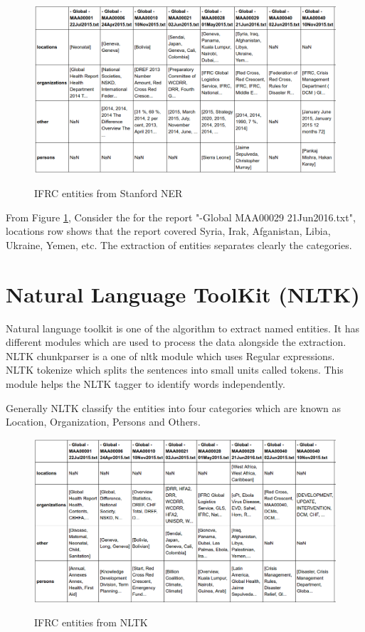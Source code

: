 \begin{figure}[hbtp]
\caption{IFRC entities from Stanford NER}
\centering\includegraphics[scale =.45]{images/stanford.png} \label{stanford}
\end{figure}
From Figure \ref{stanford},  Consider the for the report "-Global MAA00029 21Jun2016.txt", locations row  shows that the report covered Syria, Irak, Afganistan, Libia, Ukraine, Yemen, etc.
The extraction of entities separates clearly the categories.
\section{Natural Language ToolKit (NLTK)}
Natural language toolkit is one of the algorithm to extract named  entities. It has different modules which are used to process the data alongside the extraction.
NLTK chunkparser is a one of nltk module  which uses Regular expressions. NLTK tokenize which splits the sentences into small units called tokens. This module helps the NLTK tagger to identify words independently. 

Generally NLTK classify the entities into four categories which are known as Location, Organization, Persons and Others. 
\newpage

\begin{figure}[hbtp]
\caption{IFRC entities from NLTK}
\centering
\includegraphics[scale=.45]{images/nltkalgo.png}\label{nltkalgo}
\end{figure}

